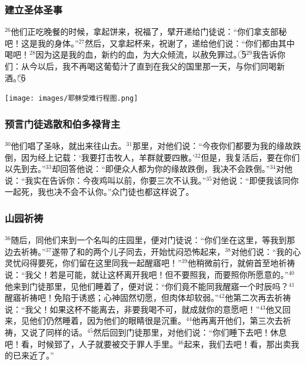 \subsubsection{建立圣体圣事}
$^{26}$他们正吃晚餐的时候，\UL[耶稣]拿起饼来，祝福了，擘开递给门徒说：“你们拿支部秘吧！这是我的身体。”$^{27}$然后，又拿起杯来，祝谢了，递给他们说：“你们都由其中喝吧！$^{28}$因为这是我的血，新约的血，为大众倾流，以赦免罪过。\textcircled{5}$^{29}$我告诉你们：从今以后，我不再喝这葡萄汁了直到在我父的国里那一天，与你们同喝新酒。”\textcircled{6}

\begin{center}
  \texttt{[image: images/耶稣受难行程图.png]}
\end{center}

\subsubsection{预言门徒逃散和伯多禄背主}
$^{30}$他们唱了圣咏，就出来往\UL[橄榄]山去。$^{31}$那里，\UL[耶稣]对他们说：“今夜你们都要为我的缘故跌倒，因为经上记载：‘我要打击牧人，羊群就要四散。’$^{32}$但是，我复活后，要在你们以先到\UL[加里肋亚]去。”$^{33}$\UL[伯多禄]却回答他说：“即便众人都为你的缘故跌倒，我决不会跌倒。”$^{34}$\UL[耶稣]对他说：“我实在告诉你：今夜鸡叫以前，你要三次不认我。”$^{35}$\UL[伯多禄]对他说：“即便我该同你一起死，我也决不会不认你。”众门徒也都这样说了。


\subsubsection{山园祈祷}
$^{36}$随后，\UL[耶稣]同他们来到一个名叫\UL[革责玛尼]的庄园里，便对门徒说：“你们坐在这里，等我到那边去祈祷。”$^{37}$遂带了\UL[伯多禄]和\UL[载伯德]的两个儿子同去，开始忧闷恐怖起来，$^{38}$对他们说：“我的心灵忧闷得要死，你们留在这里同我一起醒寤吧！”$^{39}$他稍微前行，就俯首至地祈祷说：“我父！若是可能，就让这杯离开我吧！但不要照我，而要照你所愿意的。”$^{40}$他来到门徒那里，见他们睡着了，便对\UL[伯多禄]说：“你们竟不能同我醒寤一个时辰吗？$^{41}$醒寤祈祷吧！免陷于诱惑；心神固然切愿，但肉体却软弱。”$^{42}$他第二次再去祈祷说：“我父！如果这杯不能离去，非要我喝不可，就成就你的意愿吧！”$^{43}$他又回来，见他们仍然睡着，因为他们的眼睛很是沉重。$^{44}$他再离开他们，第三次去祈祷，又说了同样的话。$^{45}$然后回到门徒那里，对他们说：“你们睡下去吧！休息吧！看，时候郅了，人子就要被交于罪人手里。$^{46}$起来，我们去吧！看，那出卖我的已来近了。”



